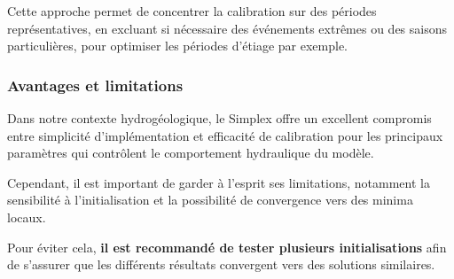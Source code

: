Cette approche permet de concentrer la calibration sur des périodes représentatives, en excluant si nécessaire des événements extrêmes ou des saisons particulières, pour optimiser les périodes d'étiage par exemple.

\subsubsection{Avantages et limitations}

Dans notre contexte hydrogéologique, le Simplex offre un excellent compromis entre simplicité d'implémentation et efficacité de calibration pour les principaux paramètres qui contrôlent le comportement hydraulique du modèle.

Cependant, il est important de garder à l'esprit ses limitations, notamment la sensibilité à l'initialisation et la possibilité de convergence vers des minima locaux. 

Pour éviter cela, \textbf{il est recommandé de tester plusieurs initialisations} afin de s'assurer que les différents résultats convergent vers des solutions similaires.